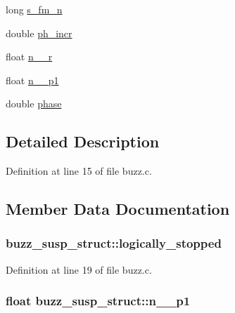 \begin{DoxyCompactItemize}
\item 
long \hyperlink{structbuzz__susp__struct_a61a97b88886acf1b39744279a3fdc70f}{s\+\_\+fm\+\_\+n}
\item 
double \hyperlink{structbuzz__susp__struct_adfc0a189f7dffa039afd0fc256ec0a91}{ph\+\_\+incr}
\item 
float \hyperlink{structbuzz__susp__struct_a8a57fa2e268144c5f1da152578a25a96}{n\+\_\+\_\+r}
\item 
float \hyperlink{structbuzz__susp__struct_a2141100e9e0adc490d5bae40b455fc80}{n\+\_\+\_\+p1}
\item 
double \hyperlink{structbuzz__susp__struct_ad9949c8c6c8223a27a67eaf329c662e9}{phase}
\end{DoxyCompactItemize}


\subsection{Detailed Description}


Definition at line 15 of file buzz.\+c.



\subsection{Member Data Documentation}
\subsubsection[{\texorpdfstring{logically\+\_\+stopped}{logically_stopped}}]{ buzz\+\_\+susp\+\_\+struct\+::logically\+\_\+stopped}\hypertarget{structbuzz__susp__struct_adcd2b245a14eed379b1dd83e1f31c3c4}{}\label{structbuzz__susp__struct_adcd2b245a14eed379b1dd83e1f31c3c4}


Definition at line 19 of file buzz.\+c.

\subsubsection[{\texorpdfstring{n\+\_\+2\+\_\+p1}{n_2_p1}}]{\setlength{\rightskip}{0pt plus 5cm}float buzz\+\_\+susp\+\_\+struct\+::n\+\_\+\_\+p1}\hypertarget{structbuzz__susp__struct_a2141100e9e0adc490d5bae40b455fc80}{}\label{structbuzz__susp__struct_a2141100e9e0adc490d5bae40b455fc80}


